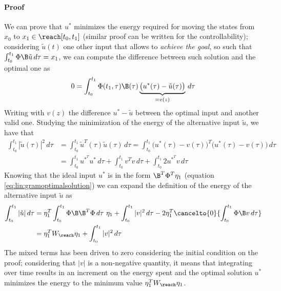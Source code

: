 	\paragraph{Proof} We can prove that $u^*$ minimizes the energy required for moving the states from $x_0$ to $x_1 \in \reach[t_0,t_1]$ (similar proof can be written for the controllability); considering $\tilde u(t)$ one other input that allows to \textit{achieve the goal}, so such that $\int_{t_0}^{t_1} \Phi \B \tilde u\, d\tau = x_1$, we can compute the difference between such solution and the optimal one as
	\[ 0 = \int_{t_0}^{t_1} \Phi(t_1,\tau) \B(\tau) \underbrace{\big( u^*(\tau) - \tilde u(\tau) \big)}_{= v(z)} \, d\tau \]
	Writing with $v(z)$ the difference $u^* - \tilde u$ between the optimal input and another valid one. Studying the minimization of the energy of the alternative input $\tilde u$, we have that
	\begin{align*}
		\int_{t_0}^{t_1} |\tilde u(\tau)|^2\, d \tau & = \int_{t_0}^{t_1} \tilde u^T(\tau) \tilde u(\tau)\, d\tau = \int_{t_0}^{t_1}\big(u^*(\tau) - v(\tau)\big)^T\big( u^*(\tau) - v(\tau) \big) \, d\tau \\
		& = \int_{t_0}^{t_1} u^{*^T} u^*\, d\tau + \int_{t_0}^{t_1} v^T v\, d\tau + \int_{t_0}^{t_1} 2 u^{*^T} v\, d\tau
	\end{align*}
	Knowing that the ideal input $u^*$ is in the form $\B^T \Phi^T \eta_1$ (equation \ref{eq:lin:gramoptimalsolution}) we can expand the definition of the energy of the alternative input $\tilde u$ as
	\begin{align*}
		\int_{t_0}^{t_1} |\tilde u|\, d\tau & = \eta_1^T \int_{t_0}^{t_1} \Phi \B \B^T \Phi\, d\tau\ \eta_1 + \int_{t_0}^{t_1} |v|^2\, d\tau - 2 \eta_1^T \cancelto{0}{\int_{t_0}^{t_1} \Phi\B v \, d\tau} \\
		& = \eta_1^T W_\reach \eta_1 + \int_{t_0}^{t_1} |v|^2\, d\tau
	\end{align*}
	The mixed terms has been driven to zero considering the initial condition on the proof; considering that $|v|$ is a non-negative quantity, it means that integrating over time results in an increment on the energy spent and the optimal solution $u^*$ minimizes the energy to the minimum value $\eta_1^T W_\reach \eta_1$.
	
